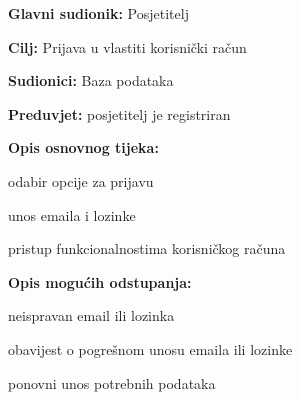 					\noindent {}
					\begin{packed_item}
	
						\item \textbf{Glavni sudionik: }Posjetitelj
						\item  \textbf{Cilj:} Prijava u vlastiti korisnički račun
						\item  \textbf{Sudionici:} Baza podataka
						\item  \textbf{Preduvjet:} posjetitelj je registriran
						\item  \textbf{Opis osnovnog tijeka:}
						
						\item[] \begin{packed_enum}
	
							\item odabir opcije za prijavu 
							\item unos emaila i lozinke
							\item pristup funkcionalnostima korisničkog računa
							
						\end{packed_enum}
						
						\item  \textbf{Opis mogućih odstupanja:}
						
						\item[] \begin{packed_item}
	
							\item[2.a] neispravan email ili lozinka
							\item[] \begin{packed_enum}
								
								\item obavijest o pogrešnom unosu emaila ili lozinke
								\item ponovni unos potrebnih podataka
								
							\end{packed_enum}
							
						\end{packed_item}
					\end{packed_item}
					
